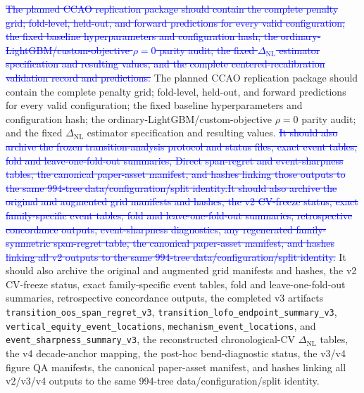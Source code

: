 \documentclass[10pt]{article}
\theoremstyle{definition}
\newcommand{\1}{\mathbf{1}}
\newcommand{\oldtext}[1]{\textcolor{blue}{\sout{#1}}}
\newcommand{\newtext}[1]{\textcolor{impGreen}{#1}}
\newcommand{\latesttext}[1]{\textcolor{latestPurple}{#1}}
\begin{document}
\oldtext{The planned CCAO replication package should contain the complete penalty grid; fold-level, held-out, and forward predictions for every valid configuration; the fixed baseline hyperparameters and configuration hash; the ordinary-LightGBM/custom-objective $\rho=0$ parity audit; the fixed $\Delta_{\mathrm{NL}}$ estimator specification and resulting values; and the complete centered-recalibration validation record and predictions.}
\newtext{The planned CCAO replication package should contain the complete penalty grid; fold-level, held-out, and forward predictions for every valid configuration; the fixed baseline hyperparameters and configuration hash; the ordinary-LightGBM/custom-objective $\rho=0$ parity audit; and the fixed $\Delta_{\mathrm{NL}}$ estimator specification and resulting values.} \oldtext{It should also archive the frozen transition-analysis protocol and status files, exact event tables, fold and leave-one-fold-out summaries, Direct span-regret and event-sharpness tables, the canonical paper-asset manifest, and hashes linking those outputs to the same 994-tree data/configuration/split identity.}\oldtext{It should also archive the original and augmented grid manifests and hashes, the v2 CV-freeze status, exact family-specific event tables, fold and leave-one-fold-out summaries, retrospective concordance outputs, event-sharpness diagnostics, any regenerated family-symmetric span-regret table, the canonical paper-asset manifest, and hashes linking all v2 outputs to the same 994-tree data/configuration/split identity.}
\latesttext{It should also archive the original and augmented grid manifests and hashes, the v2 CV-freeze status, exact family-specific event tables, fold and leave-one-fold-out summaries, retrospective concordance outputs, the completed v3 artifacts \texttt{transition\_oos\_span\_regret\_v3}, \texttt{transition\_lofo\_endpoint\_summary\_v3}, \texttt{vertical\_equity\_event\_locations}, \texttt{mechanism\_event\_locations}, and \texttt{event\_sharpness\_summary\_v3}, the reconstructed chronological-CV $\Delta_{\mathrm{NL}}$ tables, the v4 decade-anchor mapping, the post-hoc bend-diagnostic status, the v3/v4 figure QA manifests, the canonical paper-asset manifest, and hashes linking all v2/v3/v4 outputs to the same 994-tree data/configuration/split identity.}
\end{document}
